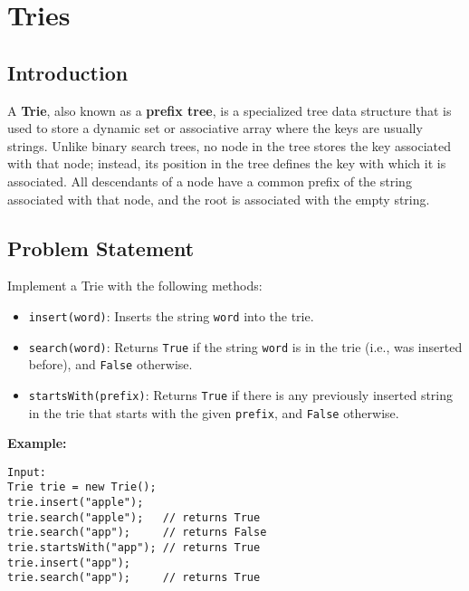 
\chapter{Tries}
\label{chapter:tries}

\section*{Introduction}

A \textbf{Trie}, also known as a \textbf{prefix tree}, is a specialized tree data structure that is used to store a dynamic set or associative array where the keys are usually strings. Unlike binary search trees, no node in the tree stores the key associated with that node; instead, its position in the tree defines the key with which it is associated. All descendants of a node have a common prefix of the string associated with that node, and the root is associated with the empty string.

\section*{Problem Statement}

Implement a Trie with the following methods:

\begin{itemize}
    \item \texttt{insert(word)}: Inserts the string \texttt{word} into the trie.
    \item \texttt{search(word)}: Returns \texttt{True} if the string \texttt{word} is in the trie (i.e., was inserted before), and \texttt{False} otherwise.
    \item \texttt{startsWith(prefix)}: Returns \texttt{True} if there is any previously inserted string in the trie that starts with the given \texttt{prefix}, and \texttt{False} otherwise.
\end{itemize}

\textbf{Example:}

\begin{verbatim}
Input:
Trie trie = new Trie();
trie.insert("apple");
trie.search("apple");   // returns True
trie.search("app");     // returns False
trie.startsWith("app"); // returns True
trie.insert("app");   
trie.search("app");     // returns True
\end{verbatim}


